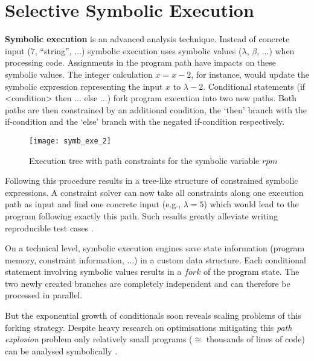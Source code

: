 \section{Selective Symbolic Execution}\label{sec:s2e}



\textbf{Symbolic execution} is an advanced analysis technique.
Instead of concrete input (7, ``string'', ...) symbolic execution uses symbolic values ($\lambda$, $\beta$, ...) when processing code.
Assignments in the program path have impacts on these symbolic values.
The integer calculation $x = x - 2$, for instance, would update the symbolic expression representing the input $x$ to $\lambda - 2$.
Conditional statements (if <condition> then ... else ...) fork program execution into two new paths.
Both paths are then constrained by an additional condition, the `then' branch with the if-condition and the `else' branch with the negated if-condition respectively.

\begin{figure}
\texttt{[image: symb\_exe\_2]}
\caption{Execution tree with path constraints for the symbolic variable $rpm$ \cite{chip14s2e}}
\label{fig:arch}
\end{figure}

Following this procedure results in a tree-like structure of constrained symbolic expressions.
A constraint solver can now take all constraints along one execution path as input and find one concrete input (e.g., $\lambda = 5$) which would lead to the program following exactly this path.
Such results greatly alleviate writing reproducible test cases \cite{chip09sel}.

On a technical level, symbolic execution engines save state information (program memory, constraint information, ...) in a custom data structure.
Each conditional statement involving symbolic values results in a $fork$ of the program state.
The two newly created branches are completely independent and can therefore be processed in parallel.

But the exponential growth of conditionals soon reveals scaling problems of this forking strategy.
Despite heavy research on optimisations mitigating this \textit{path explosion} problem
only relatively small programs ($\cong$ thousands of lines of code) can be analysed symbolically \cite{chip09sel}.

